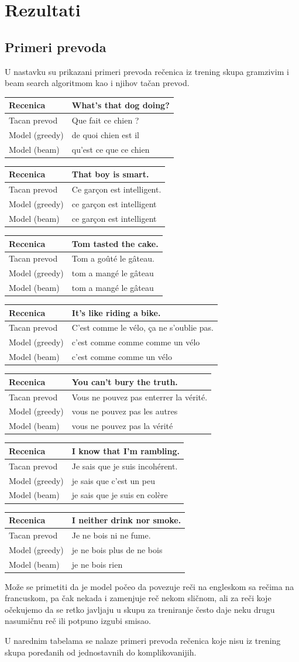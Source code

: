 \documentclass[a4paper]{article}
\begin{document}
\section{Rezultati}

\subsection{Primeri prevoda}

\newcommand\translation[4] 
{\begin{center}
  \begin{tabularx}{\textwidth}{ |l|X| } 
    \hline
    Recenica & #1 \\
    \hline
    Tacan prevod & #2 \\
    \hline
    Model (greedy) & #3 \\
    \hline
    Model (beam) & #4 \\
    \hline
  \end{tabularx}
\end{center}}

U nastavku su prikazani primeri prevoda rečenica iz trening skupa gramzivim i beam search algoritmom kao i njihov tačan prevod.

\translation
{What's that dog doing?}
{Que fait ce chien ?}
{de quoi chien est il}
{qu'est ce que ce chien}
\translation
{That boy is smart.}
{Ce garçon est intelligent.}
{ce garçon est intelligent}
{ce garçon est intelligent}
\translation
{Tom tasted the cake.}
{Tom a goûté le gâteau.}
{tom a mangé le gâteau}
{tom a mangé le gâteau}
\translation
{It's like riding a bike.}
{C'est comme le vélo, ça ne s'oublie pas.}
{c'est comme comme comme un vélo}
{c'est comme comme un vélo}
\translation
{You can't bury the truth.}
{Vous ne pouvez pas enterrer la vérité.}
{vous ne pouvez pas les autres}
{vous ne pouvez pas la vérité}
\translation
{I know that I'm rambling.}
{Je sais que je suis incohérent.}
{je sais que c'est un peu}
{je sais que je suis en colère}
\translation
{I neither drink nor smoke.}
{Je ne bois ni ne fume.}
{je ne bois plus de ne bois}
{je ne bois rien}

Može se primetiti da je model počeo da povezuje reči na engleskom sa rečima na francuskom, pa čak nekada i zamenjuje reč nekom sličnom, ali za reči koje očekujemo da se retko javljaju u skupu za treniranje često daje neku drugu nasumičnu reč ili potpuno izgubi smisao.

U narednim tabelama se nalaze primeri prevoda rečenica koje nisu iz trening skupa poređanih od jednostavnih do komplikovanijih.
\end{document}
